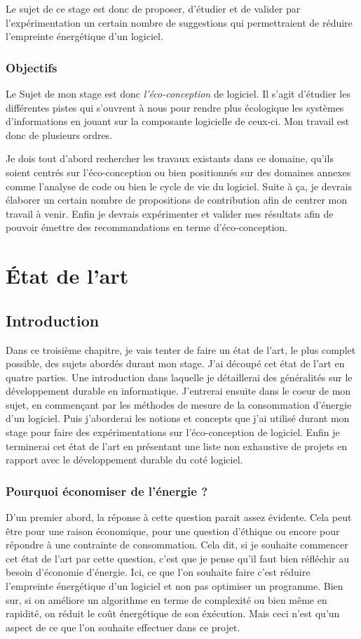 \documentclass[a4paper, 11pt]{report}
\begin{document}
Le sujet de ce stage est donc de proposer, d'étudier et de valider par l'expérimentation un certain nombre de suggestions qui permettraient de réduire l'empreinte énergétique d'un logiciel.

		\subsection{Objectifs}
Le Sujet de mon stage est donc \textit{l'éco-conception} de logiciel. Il s'agit d'étudier les différentes pistes qui s'ouvrent à nous pour rendre plus écologique les systèmes d'informations en jouant sur la composante logicielle de ceux-ci. Mon travail est donc de plusieurs ordres.

Je dois tout d'abord rechercher les travaux existants dans ce domaine, qu'ils soient centrés sur l'éco-conception ou bien positionnés sur des domaines annexes comme l'analyse de code ou bien le cycle de vie du logiciel. Suite à ça, je devrais élaborer un certain nombre de propositions de contribution afin de centrer mon travail à venir. Enfin je devrais expérimenter et valider mes résultats afin de pouvoir émettre des recommandations en terme d'éco-conception.

\chapter{État de l'art}
	\section{Introduction}
Dans ce troisième chapitre, je vais tenter de faire un état de l'art, le plus complet possible, des sujets abordés durant mon stage. J'ai découpé cet état de l'art en quatre parties. Une introduction dans laquelle je détaillerai des généralités sur le développement durable en informatique. J'entrerai ensuite dans le coeur de mon sujet, en commençant par les méthodes de mesure de la consommation d'énergie d'un logiciel. Puis j'aborderai les notions et concepts que j'ai utilisé durant mon stage pour faire des expérimentations sur l'éco-conception de logiciel. Enfin je terminerai cet état de l'art en présentant une liste non exhaustive de projets en rapport avec le développement durable du coté logiciel.

		\subsection{Pourquoi économiser de l'énergie ?}
D'un premier abord, la réponse à cette question parait assez évidente. Cela peut être pour une raison économique, pour une question d'éthique ou encore pour répondre à une contrainte de consommation. Cela dit, si je souhaite commencer cet état de l'art par cette question, c'est que je pense qu'il faut bien réfléchir au besoin d'économie d'énergie. Ici, ce que l'on souhaite faire c'est réduire l'empreinte énergétique d'un logiciel et non pas optimiser un programme. Bien sur, si on améliore un algorithme en terme de complexité ou bien même en rapidité, on réduit le coût énergétique de son éxécution. Mais ceci n'est qu'un aspect de ce que l'on souhaite effectuer dans ce projet. 
\end{document}
